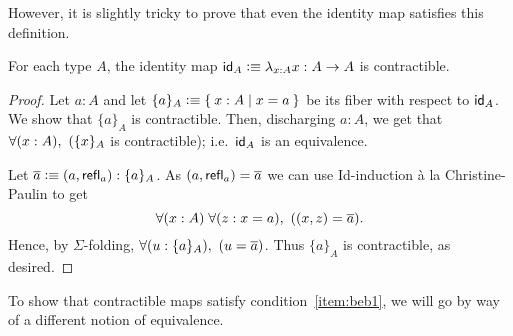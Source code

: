 However, it is slightly tricky to prove that even the identity map satisfies this definition.

\begin{lem}\label{lem:id-map}
For each type $A$, the identity map $\idfunc[A]\defeq \lambda_{x:A}x :A\ra A$ is contractible.
\end{lem}
\begin{proof}
  Let $a:A$ and let $\{a\}_A\defeq \setof{ x:A | x=a }$ be its fiber with respect to $\idfunc[A]$.
  We show that $\{ a\}_A$ is contractible.
  Then, discharging $a:A$, we get that $\fall{x:A} (\{ x\}_A$ is contractible); i.e.\ $\idfunc[A]$ is an equivalence.

  Let $\oa \defeq (a,\refl{a}):\{ a\}_A$.  As $(a,\refl{a}) = \oa$ we can use Id-induction \`{a} la Christine-Paulin to get
  \[\fall{x:A}{z:x=a} ((x,z)=\oa).\]
  Hence, by $\Sigma$-folding, $\fall{u:\{ a\}_A} (u=\oa)$.
  Thus $\{ a\}_A$ is contractible, as desired.
\end{proof}

To show that contractible maps satisfy condition~\ref{item:beb1}, we will go by way of a different notion of equivalence.






